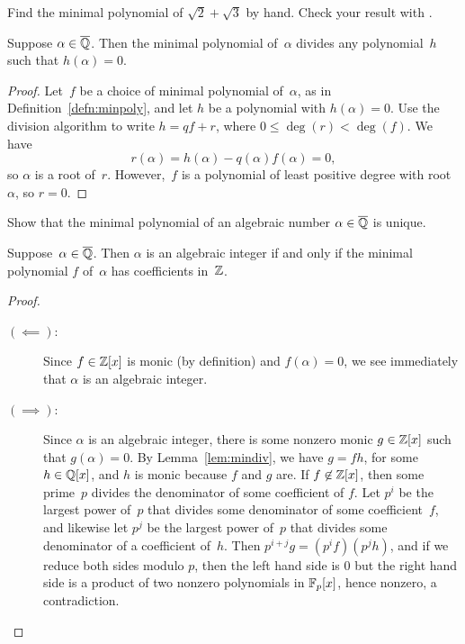 \begin{exercise}
	Find the minimal polynomial of $\sqrt{2} + \sqrt{3}$ by hand.
	Check your result with \sage{}.
\end{exercise}

\begin{lemma}\label{lem:mindiv}
	Suppose $\alpha \in\overline{\mathbb{Q}}$.  Then the minimal polynomial of~$\alpha$
	divides any polynomial~$h$ such that $h(\alpha)=0$.
\end{lemma}
\begin{proof}
	Let~$f$ be a choice of minimal polynomial of~$\alpha$, as in
	Definition~\ref{defn:minpoly}, and let $h$ be a polynomial with
	$h(\alpha)=0$.  Use the division algorithm to write $h=qf + r$,
	where $0\leq \deg(r) < \deg(f)$.  We have $$r(\alpha) = h(\alpha) -
	q(\alpha) f(\alpha) = 0,$$ so $\alpha$ is a root of~$r$.
	However,~$f$ is a polynomial of least positive degree with
	root~$\alpha$, so $r=0$.
\end{proof}

\begin{exercise}
	Show that the minimal polynomial of an algebraic number
	$\alpha\in\overline{\mathbb{Q}}$ is unique.
\end{exercise}

\begin{lemma}
	\label{lem:minpolint}
	Suppose~$\alpha \in\overline{\mathbb{Q}}$. Then $\alpha$ is an algebraic integer if
	and only if the minimal polynomial $f$ of~$\alpha$ has coefficients
	in~$\mathbb{Z}$.
\end{lemma}
\begin{proof}
	\hfill
	\begin{description}
		\item[$(\impliedby)$:]
			Since $f\in \mathbb{Z}[x]$ is monic (by definition) and $f(\alpha)=0$,
			we see immediately that $\alpha$ is an algebraic integer.
		\item[$(\implies)$:]
			Since $\alpha$ is an algebraic integer, there is
			some nonzero monic $g\in\mathbb{Z}[x]$ such that $g(\alpha)=0$.
			By Lemma~\ref{lem:mindiv}, we have $g=fh$, for some $h\in\mathbb{Q}[x]$,
			and $h$ is monic because $f$ and $g$ are.  If $f\not\in\mathbb{Z}[x]$,
			then some prime~$p$ divides the denominator of some coefficient
			of $f$.  Let $p^i$ be the largest power of~$p$ that divides some 
			denominator of some coefficient~$f$, and likewise let $p^j$ be
			the largest power of~$p$ that divides some denominator of a 
			coefficient of~$h$.  Then $p^{i+j}g = (p^if)(p^j h)$, and if we 
			reduce both sides modulo $p$, then the left hand side is $0$ but 
			the right hand side is a product of two nonzero polynomials in 
			$\mathbb{F}_p[x]$, hence nonzero, a contradiction.
	\end{description}
\end{proof}


